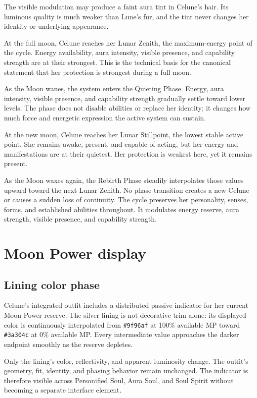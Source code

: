\documentclass[10pt]{article}
\begin{document}
The visible modulation may produce a faint aura tint in Celune's hair. Its luminous quality is much weaker than Lune's fur, and the tint never changes her identity or underlying appearance.

At the full moon, Celune reaches her Lunar Zenith, the maximum-energy point of the cycle. Energy availability, aura intensity, visible presence, and capability strength are at their strongest. This is the technical basis for the canonical statement that her protection is strongest during a full moon.

As the Moon wanes, the system enters the Quieting Phase. Energy, aura intensity, visible presence, and capability strength gradually settle toward lower levels. The phase does not disable abilities or replace her identity; it changes how much force and energetic expression the active system can sustain.

At the new moon, Celune reaches her Lunar Stillpoint, the lowest stable active point. She remains awake, present, and capable of acting, but her energy and manifestations are at their quietest. Her protection is weakest here, yet it remains present.

As the Moon waxes again, the Rebirth Phase steadily interpolates those values upward toward the next Lunar Zenith. No phase transition creates a new Celune or causes a sudden loss of continuity. The cycle preserves her personality, senses, forms, and established abilities throughout. It modulates energy reserve, aura strength, visible presence, and capability strength.

\newpage

\section*{Moon Power display}
\subsection*{Lining color phase}

Celune's integrated outfit includes a distributed passive indicator for her current Moon Power reserve. The silver lining is not decorative trim alone: its displayed color is continuously interpolated from \texttt{\#9f96af} at 100\% available MP toward \texttt{\#3a304c} at 0\% available MP. Every intermediate value approaches the darker endpoint smoothly as the reserve depletes.

Only the lining's color, reflectivity, and apparent luminosity change. The outfit's geometry, fit, identity, and phasing behavior remain unchanged. The indicator is therefore visible across Personified Soul, Aura Soul, and Soul Spirit without becoming a separate interface element.
\end{document}
